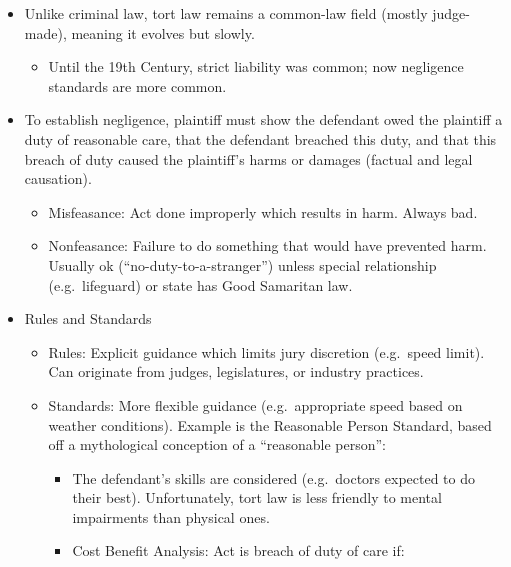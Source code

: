 \documentclass[
]{article}
\providecommand{\tightlist}{%
  \setlength{\itemsep}{0pt}\setlength{\parskip}{0pt}}
\begin{document}
\begin{itemize}
\item
  Unlike criminal law, tort law remains a common-law field (mostly
  judge-made), meaning it evolves but slowly.

  \begin{itemize}
  \tightlist
  \item
    Until the 19th Century, strict liability was common; now negligence
    standards are more common.
  \end{itemize}
\item
  To establish negligence, plaintiff must show the defendant owed the
  plaintiff a duty of reasonable care, that the defendant breached this
  duty, and that this breach of duty caused the plaintiff's harms or
  damages (factual and legal causation).

  \begin{itemize}
  \item
    Misfeasance: Act done improperly which results in harm. Always bad.
  \item
    Nonfeasance: Failure to do something that would have prevented harm.
    Usually ok (``no-duty-to-a-stranger'') unless special relationship
    (e.g.~lifeguard) or state has Good Samaritan law.
  \end{itemize}
\item
  Rules and Standards

  \begin{itemize}
  \item
    Rules: Explicit guidance which limits jury discretion (e.g.~speed
    limit). Can originate from judges, legislatures, or industry
    practices.
  \item
    Standards: More flexible guidance (e.g.~appropriate speed based on
    weather conditions). Example is the Reasonable Person Standard,
    based off a mythological conception of a ``reasonable person'':

    \begin{itemize}
    \item
      The defendant's skills are considered (e.g.~doctors expected to do
      their best). Unfortunately, tort law is less friendly to mental
      impairments than physical ones.
    \item
      Cost Benefit Analysis: Act is breach of duty of care if:
    \end{itemize}
  \end{itemize}
\end{itemize}
\end{document}
